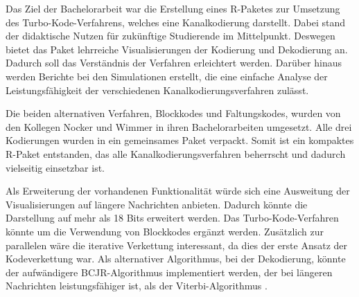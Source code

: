 Das Ziel der Bachelorarbeit war die Erstellung eines R-Paketes zur Umsetzung des  Turbo-Kode-Verfahrens, welches eine Kanalkodierung darstellt. Dabei stand der didaktische Nutzen für zukünftige Studierende im Mittelpunkt. Deswegen bietet das Paket lehrreiche Visualisierungen der Kodierung und Dekodierung an. Dadurch soll das Verständnis der Verfahren erleichtert werden. Darüber hinaus werden Berichte bei den Simulationen erstellt, die eine einfache Analyse der Leistungsfähigkeit der verschiedenen Kanalkodierungsverfahren zulässt.

Die beiden alternativen Verfahren, Blockkodes und Faltungskodes, wurden von den Kollegen Nocker \cite{nocker} und Wimmer \cite{wimmer} in ihren Bachelorarbeiten umgesetzt. Alle drei Kodierungen wurden in ein gemeinsames Paket verpackt. Somit ist ein kompaktes R-Paket entstanden, das alle Kanalkodierungsverfahren beherrscht und dadurch vielseitig einsetzbar ist.  

Als Erweiterung der vorhandenen Funktionalität würde sich eine Ausweitung der Visualisierungen auf längere Nachrichten anbieten. Dadurch könnte die Darstellung auf mehr als 18 Bits erweitert werden. Das Turbo-Kode-Verfahren könnte um die Verwendung von Blockkodes ergänzt werden. Zusätzlich zur parallelen wäre die iterative Verkettung interessant, da dies der erste Ansatz der Kodeverkettung war. Als alternativer Algorithmus, bei der Dekodierung, könnte der aufwändigere BCJR-Algorithmus implementiert werden, der bei längeren Nachrichten leistungsfähiger ist, als der Viterbi-Algorithmus \cite[233-236]{schoenfeld2012informations}.
